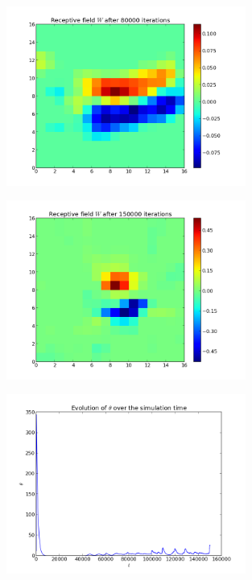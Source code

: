 \begin{figure}[h]
\centering
\includegraphics[width=0.7\textwidth]{../ex3/results1/img09}
\caption{}
\label{fig:img09}
\end{figure}

\begin{figure}[h]
\centering
\includegraphics[width=0.7\textwidth]{../ex3/results1/img16}
\caption{}
\label{fig:img16}
\end{figure}

\begin{figure}[h]
\centering
\includegraphics[width=0.7\textwidth]{../ex3/results1/theta}
\caption{}
\label{fig:theta}
\end{figure}

